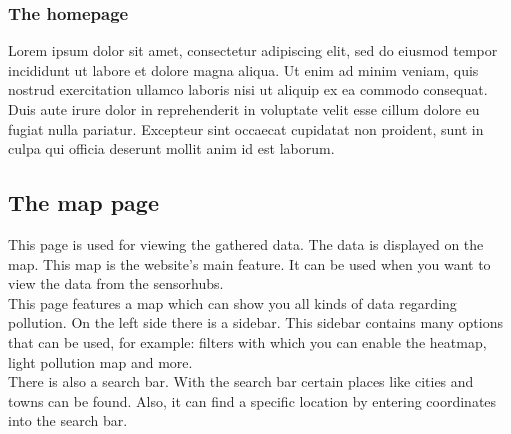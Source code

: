 \documentclass[a4paper]{article}
\begin{document}
\pagebreak

\subsubsection{The homepage}
Lorem ipsum dolor sit amet, consectetur adipiscing elit, sed do eiusmod tempor incididunt ut labore et dolore magna aliqua. Ut enim ad minim veniam, quis nostrud exercitation ullamco laboris nisi ut aliquip ex ea commodo consequat. Duis aute irure dolor in reprehenderit in voluptate velit esse cillum dolore eu fugiat nulla pariatur. Excepteur sint occaecat cupidatat non proident, sunt in culpa qui officia deserunt mollit anim id est laborum.
% 
% 
~\\

\subsection{The map page}
This page is used for viewing the gathered data. The data is displayed on the map. This map is the website's main feature. It can be used when you want to view the data from the sensorhubs.
\\
This page features a map which can show you all kinds of data regarding pollution. On the left side there is a sidebar. This sidebar contains many options that can be used, for example: filters with which you can enable the heatmap, light pollution map and more.
\\
There is also a search bar. With the search bar certain places like cities and towns can be found. Also, it can find a specific location by entering coordinates into the search bar.

\pagebreak
\end{document}
